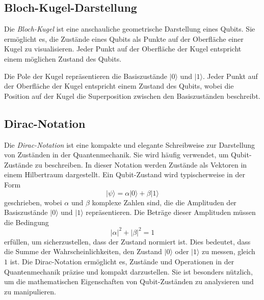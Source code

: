 \subsection{Bloch-Kugel-Darstellung}
Die \emph{Bloch-Kugel} ist eine anschauliche geometrische Darstellung eines Qubits. Sie ermöglicht es, die Zustände eines Qubits als Punkte auf der Oberfläche einer Kugel zu visualisieren. Jeder Punkt auf der Oberfläche der Kugel entspricht einem möglichen Zustand des Qubits.
\begin{center}
\end{center}

Die Pole der Kugel repräsentieren die Basiszustände \(|0\rangle\) und \(|1\rangle\). Jeder Punkt auf der Oberfläche der Kugel entspricht einem Zustand des Qubits, wobei die Position auf der Kugel die Superposition zwischen den Basiszuständen beschreibt.

\subsection{Dirac-Notation}
Die \emph{Dirac-Notation} ist eine kompakte und elegante Schreibweise zur Darstellung von Zuständen in der Quantenmechanik. Sie wird häufig verwendet, um Qubit-Zustände zu beschreiben. In dieser Notation werden Zustände als Vektoren in einem Hilbertraum dargestellt.
Ein Qubit-Zustand wird typischerweise in der Form
\[
|\psi\rangle = \alpha |0\rangle + \beta |1\rangle\]
geschrieben, wobei \(\alpha\) und \(\beta\) komplexe Zahlen sind, die die Amplituden der Basiszustände \(|0\rangle\) und \(|1\rangle\) repräsentieren. Die Beträge dieser Amplituden müssen die Bedingung
\[
|\alpha|^2 + |\beta|^2 = 1\]
erfüllen, um sicherzustellen, dass der Zustand normiert ist. Dies bedeutet, dass die Summe der Wahrscheinlichkeiten, den Zustand \(|0\rangle\) oder \(|1\rangle\) zu messen, gleich \(1\) ist.
Die Dirac-Notation ermöglicht es, Zustände und Operationen in der Quantenmechanik präzise und kompakt darzustellen. Sie ist besonders nützlich, um die mathematischen Eigenschaften von Qubit-Zuständen zu analysieren und zu manipulieren.

